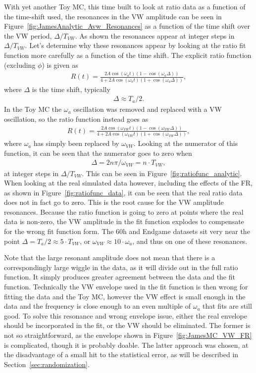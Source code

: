 \documentclass[12pt,letterpaper]{article}
\newcommand{\figref}[1]{Figure~\ref{#1}}
\def\wa{$\omega_{a}$\xspace}
\begin{document}
With yet another Toy MC, this time built to look at ratio data as a function of the time-shift used, the resonances in the VW amplitude can be seen in \figref{fig:JamesAnalytic_Avw_Resonances} as a function of the time shift over the VW period, $\Delta/T_{VW}$. As shown the resonances appear at integer steps in $\Delta/T_{VW}$. Let's determine why these resonances appear by looking at the ratio fit function more carefully as a function of the time shift. The explicit ratio function (excluding $\phi$) is given as \cite{60hReport}
    \begin{align}
        R(t) = \frac{2 A \cos(\omega_{a}t) (1 - \cos{(\omega_{a}\Delta)})} {4 + 2A \cos(\omega_{a}t) (1 + \cos{(\omega_{a}\Delta)} )},
    \end{align}
where $\Delta$ is the time shift, typically 
    \begin{align}
        \Delta \approx T_{a}/2.
    \end{align}
In the Toy MC the \wa oscillation was removed and replaced with a VW oscillation, so the ratio function instead goes as 
    \begin{align}
        R(t) = \frac{2 A \cos(\omega_{VW}t) (1 - \cos{(\omega_{VW}\Delta)})} {4 + 2A \cos(\omega_{VW}t) (1 + \cos{(\omega_{VW}\Delta)} )},
    \end{align}
where \wa has simply been replaced by $\omega_{VW}$. Looking at the numerator of this function, it can be seen that the numerator goes to zero when 
    \begin{align}
        \Delta = 2n\pi/\omega_{VW} = n \cdot T_{VW},
    \end{align}
at integer steps in $\Delta/T_{VW}$. This can be seen in \figref{fig:ratiofunc_analytic}. When looking at the real simulated data however, including the effects of the FR, as shown in \figref{fig:ratiofunc_data}, it can be seen that the real ratio data does not in fact go to zero. This is the root cause for the VW amplitude resonances. Because the ratio function is going to zero at points where the real data is non-zero, the VW amplitude in the fit function explodes to compensate for the wrong fit function form. The 60h and Endgame datasets sit very near the point $\Delta = T_{a}/2 \approx 5 \cdot T_{VW}$, or $\omega_{VW} \approx 10 \cdot \omega_{a}$, and thus on one of these resonances.

Note that the large resonant amplitude does not mean that there is a correspondingly large wiggle in the data, as it will divide out in the full ratio function. It simply produces greater agreement between the data and the fit function. Technically the VW envelope used in the fit function is then wrong for fitting the data and the Toy MC, however the VW effect is small enough in the data and the frequency is close enough to an even multiple of \wa that fits are still good. To solve this resonance and wrong envelope issue, either the real envelope should be incorporated in the fit, or the VW should be eliminated. The former is not so straightforward, as the envelope shown in \figref{fig:JamesMC_VW_FR} is complicated, though it is probably doable. The latter approach was chosen, at the disadvantage of a small hit to the statistical error, as will be described in Section~\ref{sec:randomization}.
\end{document}
